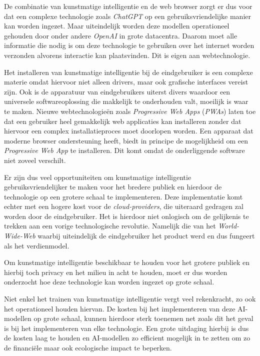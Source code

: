 \bigbreak{}

De combinatie van kunstmatige intelligentie en de web browser zorgt er dus voor dat een complexe technologie zoals \textit{ChatGPT} op een gebruiksvriendelijke manier kan worden ingezet. Maar uiteindelijk worden deze modellen operationeel gehouden door onder andere \textit{OpenAI} in grote datacentra. Daarom moet alle informatie die nodig is om deze technologie te gebruiken over het internet worden verzonden alvorens interactie kan plaatsvinden. Dit is eigen aan webtechnologie.

\break{}

Het installeren van kunstmatige intelligentie bij de eindgebruiker is een complexe materie omdat hiervoor niet alleen drivers, maar ook grafische interfaces vereist zijn. Ook is de apparatuur van eindgebruikers uiterst divers waardoor een universele softwareoplossing die makkelijk te onderhouden valt, moeilijk is waar te maken. Nieuwe webtechnologieën zoals \textit{Progressive Web Apps} (\textit{PWAs}) laten toe dat een gebruiker heel gemakkelijk web applicaties kan installeren zonder dat hiervoor een complex installatieproces moet doorlopen worden. Een apparaat dat moderne browser ondersteuning heeft, biedt in principe de mogelijkheid om een \textit{Progressive Web App} te installeren. Dit komt omdat de onderliggende software niet zoveel verschilt.

\bigbreak{}

Er zijn dus veel opportuniteiten om kunstmatige intelligentie gebruiksvriendelijker te maken voor het bredere publiek en hierdoor de technologie op een grotere schaal te implementeren. Deze implementatie komt echter met een hogere kost voor de \textit{cloud-providers}, die uiteraard gedragen zal worden door de eind\-ge\-brui\-ker. Het is hierdoor niet onlogisch om de gelijkenis te trekken aan een vorige technologische revolutie. Namelijk die van het \textit{World-Wide-Web} waarbij uiteindelijk de eind\-ge\-brui\-ker het product werd en dus fungeert als het verdienmodel.

\bigbreak{}

Om kunstmatige intelligentie beschikbaar te houden voor het grotere publiek en hierbij toch privacy en het milieu in acht te houden, moet er dus worden onderzocht hoe deze technologie kan worden ingezet op grote schaal.

\bigbreak{}

Niet enkel het trainen van kunstmatige intelligentie vergt veel rekenkracht, zo ook het operationeel houden hiervan. De kosten bij het implementeren van deze AI-modellen op grote schaal, kunnen hierdoor sterk toenemen net zoals dit het geval is bij het implementeren van elke technologie. Een grote uitdaging hierbij is dus de kosten laag te houden en AI-modellen zo efficient mogelijk in te zetten om zo de financiële maar ook ecologische impact te beperken.

